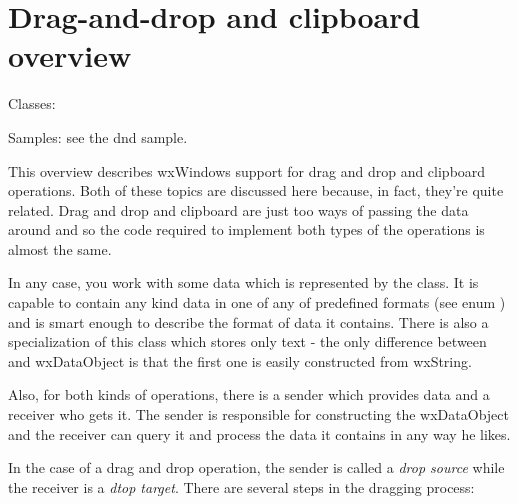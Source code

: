 \section{Drag-and-drop and clipboard overview}\label{wxdndoverview}

Classes: 


Samples: see the dnd sample.

This overview describes wxWindows support for drag and drop and clipboard
operations. Both of these topics are discussed here because, in fact, they're
quite related. Drag and drop and clipboard are just too ways of passing the
data around and so the code required to implement both types of the operations
is almost the same.

In any case, you work with some data which is represented by
the  class. It is capable to contain any kind
data in one of any of predefined formats (see enum ) and is smart enough to describe the format
of data it contains. There is also a specialization of this class which stores
only text - the only difference between  and wxDataObject is that the
first one is easily constructed from wxString.

Also, for both kinds of operations, there is a sender which provides data and
a receiver who gets it. The sender is responsible for constructing the
wxDataObject and the receiver can query it and process the data it contains
in any way he likes.

In the case of a drag and drop operation, the sender is called a {\it drop
source} while the receiver is a {\it dtop target}. There are several steps in
the dragging process:

